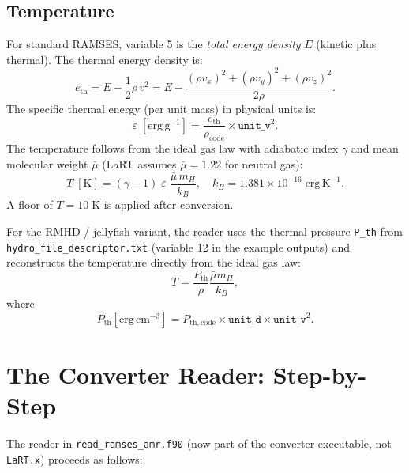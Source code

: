\documentclass[english,a4paper]{my_memo}
\begin{document}
\subsection{Temperature}

For standard RAMSES, variable 5 is the \emph{total energy density} $E$
(kinetic plus thermal).  The thermal energy density is:
\begin{equation}
  e_\mathrm{th} = E - \frac{1}{2}\rho\,v^2
  = E - \frac{(\rho v_x)^2 + (\rho v_y)^2 + (\rho v_z)^2}{2\rho}.
\end{equation}
The specific thermal energy (per unit mass) in physical units is:
\begin{equation}
  \varepsilon \;[\mathrm{erg\,g}^{-1}]
  = \frac{e_\mathrm{th}}{\rho_\mathrm{code}}
    \times \texttt{unit\_v}^2.
\end{equation}
The temperature follows from the ideal gas law with adiabatic index $\gamma$
and mean molecular weight $\bar\mu$ (LaRT assumes $\bar\mu = 1.22$ for
neutral gas):
\begin{equation}
  T \;[\mathrm{K}]
  = (\gamma - 1)\;\varepsilon\;
    \frac{\bar\mu\,m_H}{k_B},
  \quad k_B = 1.381 \times 10^{-16}\;\mathrm{erg\,K}^{-1}.
\end{equation}
A floor of $T = 10\;\mathrm{K}$ is applied after conversion.

For the RMHD / jellyfish variant, the reader uses the thermal pressure
\texttt{P\_th} from \texttt{hydro\_file\_descriptor.txt} (variable 12 in the
example outputs) and reconstructs the temperature directly from the ideal gas
law:
\begin{equation}
  T = \frac{P_\mathrm{th}}{\rho}\frac{\bar\mu m_H}{k_B},
\end{equation}
where
\begin{equation}
  P_\mathrm{th}[\mathrm{erg\,cm}^{-3}]
  = P_{\mathrm{th,code}}\times \texttt{unit\_d}\times \texttt{unit\_v}^2.
\end{equation}

\section{The Converter Reader: Step-by-Step}

The reader in \texttt{read\_ramses\_amr.f90} (now part of the converter
executable, not \texttt{LaRT.x}) proceeds as follows:
\end{document}
